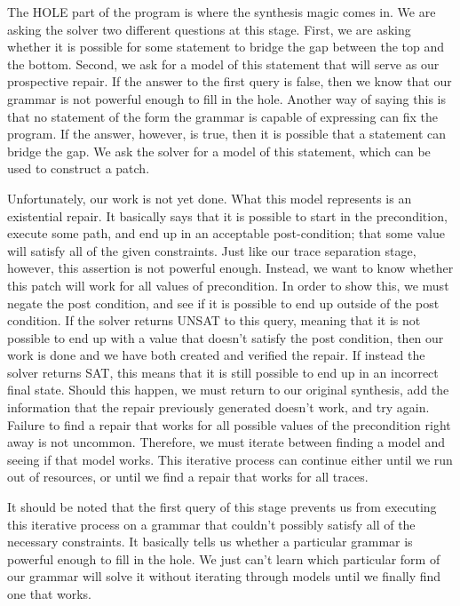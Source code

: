 \documentclass[]{article}
\begin{document}
The HOLE part of the program is where the synthesis magic comes in.  We are asking the solver two different questions at this stage.  First, we are asking whether it is possible for some statement to bridge the gap between the top and the bottom.  Second, we ask for a model of this statement that will serve as our prospective repair.  If the answer to the first query is false, then we know that our grammar is not powerful enough to fill in the hole.  Another way of saying this is that no statement of the form the grammar is capable of expressing can fix the program.  If the answer, however, is true, then it is possible that a statement can bridge the gap.  We ask the solver for a model of this statement, which can be used to construct a patch.  

Unfortunately, our work is not yet done.  What this model represents is an existential repair.  It basically says that it is possible to start in the precondition, execute some path, and end up in an acceptable post-condition; that some value will satisfy all of the given constraints.  Just like our trace separation stage, however, this assertion is not powerful enough.  Instead, we want to know whether this patch will work for all values of precondition.  In order to show this, we must negate the post condition, and see if it is possible to end up outside of the post condition.  If the solver returns UNSAT to this query, meaning that it is not possible to end up with a value that doesn't satisfy the post condition, then our work is done and we have both created and verified the repair.  If instead the solver returns SAT, this means that it is still possible to end up in an incorrect final state.  Should this happen, we must return to our original synthesis, add the information that the repair previously generated doesn't work, and try again.  Failure to find a repair that works for all possible values of the precondition right away is not uncommon.  Therefore, we must iterate between finding a model and seeing if that model works.  This iterative process can continue either until we run out of resources, or until we find a repair that works for all traces.

It should be noted that the first query of this stage prevents us from executing this iterative process on a grammar that couldn't possibly satisfy all of the necessary constraints.  It basically tells us whether a particular grammar is powerful enough to fill in the hole.  We just can't learn which particular form of our grammar will solve it without iterating through models until we finally find one that works.
\end{document}
